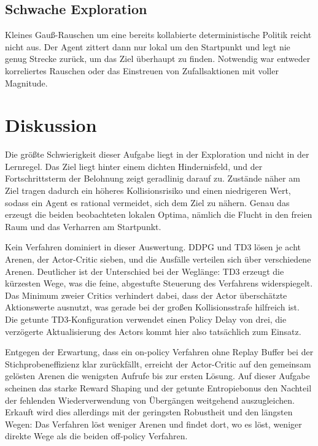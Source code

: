 \documentclass[11pt,a4paper]{article}
\begin{document}
\subsection{Schwache Exploration}
Kleines Gauß-Rauschen um eine bereits kollabierte deterministische Politik reicht nicht aus.
Der Agent zittert dann nur lokal um den Startpunkt und legt nie genug Strecke zurück, um das
Ziel überhaupt zu finden. Notwendig war entweder korreliertes Rauschen oder das Einstreuen von
Zufallsaktionen mit voller Magnitude.

\section{Diskussion}
Die größte Schwierigkeit dieser Aufgabe liegt in der Exploration und nicht in der Lernregel.
Das Ziel liegt hinter einem dichten Hindernisfeld, und der Fortschrittsterm der Belohnung zeigt
geradlinig darauf zu. Zustände näher am Ziel tragen dadurch ein höheres Kollisionsrisiko und
einen niedrigeren Wert, sodass ein Agent es rational vermeidet, sich dem Ziel zu nähern. Genau
das erzeugt die beiden beobachteten lokalen Optima, nämlich die Flucht in den freien Raum und
das Verharren am Startpunkt.

Kein Verfahren dominiert in dieser Auswertung. DDPG und TD3 lösen je acht Arenen, der
Actor-Critic sieben, und die Ausfälle verteilen sich über verschiedene Arenen.
Deutlicher ist der Unterschied bei der Weglänge: TD3 erzeugt die kürzesten Wege, was die feine,
abgestufte Steuerung des Verfahrens widerspiegelt. Das Minimum zweier Critics verhindert dabei,
dass der Actor überschätzte Aktionswerte ausnutzt, was gerade bei der großen Kollisionsstrafe
hilfreich ist. Die getunte TD3-Konfiguration verwendet einen Policy Delay von drei, die
verzögerte Aktualisierung des Actors kommt hier also tatsächlich zum Einsatz.

Entgegen der Erwartung, dass ein on-policy Verfahren ohne Replay Buffer bei der
Stichprobeneffizienz klar zurückfällt, erreicht der Actor-Critic auf den
gemeinsam gelösten Arenen die wenigsten Aufrufe bis zur ersten Lösung. Auf dieser Aufgabe
scheinen das starke Reward Shaping und der getunte Entropiebonus den Nachteil der fehlenden
Wiederverwendung von Übergängen weitgehend auszugleichen. Erkauft wird dies allerdings mit der
geringsten Robustheit und den längsten Wegen: Das Verfahren löst weniger Arenen und findet dort,
wo es löst, weniger direkte Wege als die beiden off-policy Verfahren.
\end{document}
